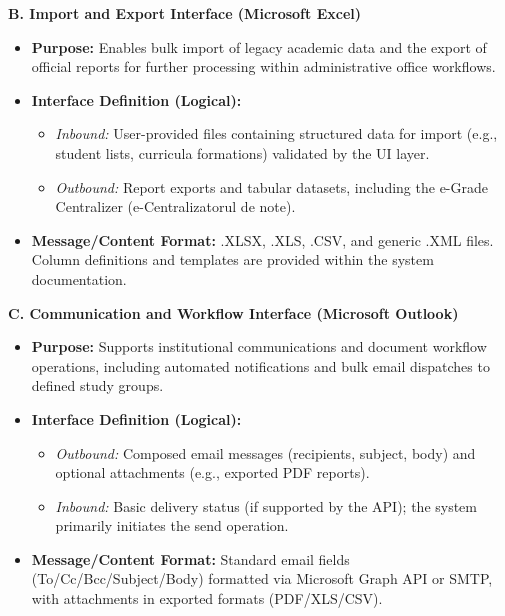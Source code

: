 \documentclass[11pt, a4paper]{article}
\begin{document}
\textbf{B. Import and Export Interface (Microsoft Excel)}
\begin{itemize}
    \item \textbf{Purpose:} Enables bulk import of legacy academic data and the export of official reports for further processing within administrative office workflows.
    \item \textbf{Interface Definition (Logical):}
    \begin{itemize}
        \item \textit{Inbound:} User-provided files containing structured data for import (e.g., student lists, curricula formations) validated by the UI layer.
        \item \textit{Outbound:} Report exports and tabular datasets, including the e-Grade Centralizer (e-Centralizatorul de note).
    \end{itemize}
    \item \textbf{Message/Content Format:} .XLSX, .XLS, .CSV, and generic .XML files. Column definitions and templates are provided within the system documentation.
\end{itemize}

\textbf{C. Communication and Workflow Interface (Microsoft Outlook)}
\begin{itemize}
    \item \textbf{Purpose:} Supports institutional communications and document workflow operations, including automated notifications and bulk email dispatches to defined study groups.
    \item \textbf{Interface Definition (Logical):}
    \begin{itemize}
        \item \textit{Outbound:} Composed email messages (recipients, subject, body) and optional attachments (e.g., exported PDF reports).
        \item \textit{Inbound:} Basic delivery status (if supported by the API); the system primarily initiates the send operation.
    \end{itemize}
    \item \textbf{Message/Content Format:} Standard email fields (To/Cc/Bcc/Subject/Body) formatted via Microsoft Graph API or SMTP, with attachments in exported formats (PDF/XLS/CSV).
\end{itemize}
\end{document}
